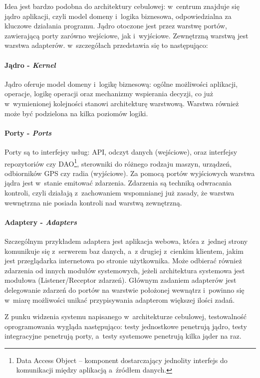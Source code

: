 Idea jest bardzo podobna do architektury cebulowej: w~centrum znajduje się jądro aplikacji, czyli model domeny i~logika biznesowa, odpowiedzialna za kluczowe działania programu. Jądro otoczone jest przez warstwę portów, zawierającą porty zarówno wejściowe, jak i~wyjściowe. Zewnętrzną warstwą jest warstwa adapterów. w~szczegółach przedstawia się to następująco:

\paragraph{Jądro - \textit{Kernel}}
Jądro oferuje model domeny i~logikę biznesową: ogólne możliwości aplikacji, operacje, logikę operacji oraz mechanizmy wspierania decyzji, co już w~wymienionej kolejności stanowi architekturę warstwową. Warstwa również może być podzielona na kilka poziomów logiki. 

\paragraph{Porty - \textit{Ports}}
Porty są to interfejsy usług: API, odczyt danych (wejściowe), oraz interfejsy repozytoriów czy DAO\footnote{Data Access Object – komponent dostarczający jednolity interfejs do komunikacji między aplikacją a~źródłem danych.}, sterowniki do różnego rodzaju maszyn, urządzeń, odbiorników GPS czy radia (wyjściowe). Za pomocą portów wyjściowych warstwa jądra jest w~stanie emitować zdarzenia. Zdarzenia są techniką odwracania kontroli, czyli działają z~zachowaniem wspomnianej już zasady, że warstwa wewnętrzna nie posiada kontroli nad warstwą zewnętrzną. 

\paragraph{Adaptery - \textit{Adapters}}
Szczególnym przykładem adaptera jest aplikacja webowa, która z~jednej strony komunikuje się z~serwerem baz danych, a~z drugiej z~cienkim klientem, jakim jest przeglądarka internetowa po stronie użytkownika. Może odbierać również zdarzenia od innych modułów systemowych, jeżeli architektura systemowa jest modułowa (Listener/Receptor zdarzeń). Głównym zadaniem adapterów jest delegowanie zdarzeń do portów na warstwie położonej wewnątrz i~powinno się w~miarę możliwości unikać przypisywania adapterom większej ilości zadań.

Z punku widzenia systemu napisanego w~architekturze cebulowej, testowalność oprogramowania wygląda następująco: testy jednostkowe penetrują jądro, testy integracyjne penetrują porty, a~testy systemowe penetrują kilka jąder na raz.

